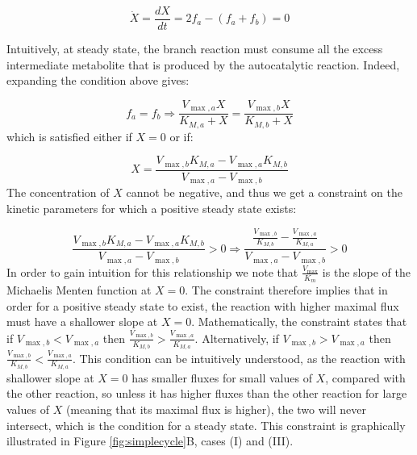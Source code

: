     \begin{equation}
      \label{eq:xdyna}
      \dot X = \frac{dX}{dt} = 2f_a - (f_a + f_b) = 0
    \end{equation}

    Intuitively, at steady state, the branch reaction must consume all the excess intermediate metabolite that is produced by the autocatalytic reaction.
    Indeed, expanding the condition above gives:

    \begin{equation*}
      f_a = f_b \Rightarrow \frac{V_{\max,a}X}{K_{M,a}+X}=\frac{V_{\max,b}X}{K_{M,b}+X}
    \end{equation*}
    which is satisfied either if $X=0$ or if:

    \begin{equation}
      \label{eq:xstst}
      X=\frac{V_{\max,b}K_{M,a}-V_{\max,a}K_{M,b}}{V_{\max,a}-V_{\max,b}}
    \end{equation}
    The concentration of $X$ cannot be negative, and thus we get a constraint on the kinetic parameters for which a positive steady state exists:

    \begin{equation*}
      \frac{V_{\max,b}K_{M,a}-V_{\max,a}K_{M,b}}{V_{\max,a}-V_{\max,b}}>0 \Rightarrow \frac{\frac{V_{\max,b}}{K_{M,b}}-\frac{V_{\max,a}}{K_{M,a}}}{V_{\max,a}-V_{\max,b}}>0
    \end{equation*}
    In order to gain intuition for this relationship we note that $\frac{V_{\max}}{K_m}$ is the slope of the Michaelis Menten function at $X=0$.
    The constraint therefore implies that in order for a positive steady state to exist, the reaction with higher maximal flux must have a shallower slope at $X=0$.
    Mathematically, the constraint states that if $V_{\max,b}<V_{\max,a}$ then $\frac{V_{\max,b}}{K_{M,b}}>\frac{V_{\max,a}}{K_{M,a}}$.
    Alternatively, if $V_{\max,b}>V_{\max,a}$ then $\frac{V_{\max,b}}{K_{M,b}}<\frac{V_{\max,a}}{K_{M,a}}$.
    This condition can be intuitively understood, as the reaction with shallower slope at $X=0$ has smaller fluxes for small values of $X$, compared with the other reaction, so unless it has higher fluxes than the other reaction for large values of $X$ (meaning that its maximal flux is higher), the two will never intersect, which is the condition for a steady state.
    This constraint is graphically illustrated in Figure \ref{fig:simplecycle}B, cases (I) and (III).

